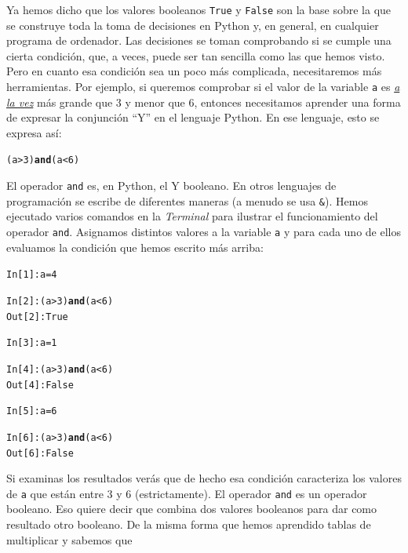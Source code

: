 \documentclass[10pt,a4paper]{article}\usepackage[]{graphicx}\usepackage[]{color}
\makeatletter
\newcommand{\hlkwd}[1]{\textcolor[rgb]{0.737,0.353,0.396}{\textbf{#1}}}%
\newenvironment{kframe}{%
 \def\at@end@of@kframe{}%
 \ifinner\ifhmode%
  \def\at@end@of@kframe{\end{minipage}}%
  \begin{minipage}{\columnwidth}%
 \fi\fi%
 \def\FrameCommand##1{\hskip\@totalleftmargin \hskip-\fboxsep
 \colorbox{shadecolor}{##1}\hskip-\fboxsep
     \hskip-\linewidth \hskip-\@totalleftmargin \hskip\columnwidth}%
 \MakeFramed {\advance\hsize-\width
   \@totalleftmargin\z@ \linewidth\hsize
   \@setminipage}}%
 {\par\unskip\endMakeFramed%
 \at@end@of@kframe}
\newenvironment{knitrout}{}{} %
\makeatother
\begin{document}
Ya hemos dicho que los valores booleanos {\tt True} y {\tt False} son la base sobre la que se construye toda la toma de decisiones en Python y, en general, en cualquier programa de ordenador. Las decisiones se toman comprobando si se cumple una cierta condición, que, a veces, puede ser tan sencilla como las que hemos visto. Pero en cuanto esa condición sea un poco más complicada, necesitaremos más herramientas. Por ejemplo, si queremos comprobar si el valor de la variable {\tt a} es \underline{\em a la vez} más grande que $3$ y menor que $6$, entonces necesitamos aprender una forma de expresar la conjunción ``Y'' en el lenguaje Python. En ese lenguaje, esto se expresa así:
\begin{knitrout}
\color{fgcolor}\begin{kframe}
\begin{alltt}
(a > 3)  \hlkwd{and} (a < 6)
\end{alltt}
\end{kframe}
\end{knitrout}
El operador {\tt and} es, en Python, el {\sf Y booleano}. En otros lenguajes de programación se escribe de diferentes maneras (a menudo se usa \verb#&#). Hemos ejecutado varios comandos en la {\em Terminal} para ilustrar el funcionamiento del operador {\tt and}. Asignamos distintos valores a la variable {\tt a} y para cada uno de ellos evaluamos la condición que hemos escrito más arriba:
\begin{knitrout}
\color{fgcolor}\begin{kframe}
\begin{alltt}
In [1]: a = 4

In [2]: (a > 3) \hlkwd{and} (a < 6)
Out[2]: True

In [3]: a = 1

In [4]: (a > 3) \hlkwd{and} (a < 6)
Out[4]: False

In [5]: a = 6

In [6]: (a > 3) \hlkwd{and} (a < 6)
Out[6]: False
\end{alltt}
\end{kframe}
\end{knitrout}
Si examinas los resultados verás que de hecho esa condición caracteriza los valores de {\tt a} que están entre 3 y 6 (estrictamente). El operador {\tt and} es un {\sf operador booleano}. Eso quiere decir que combina dos valores booleanos para dar como resultado otro booleano.  De la misma forma que hemos aprendido tablas de multiplicar y sabemos que
\end{document}
